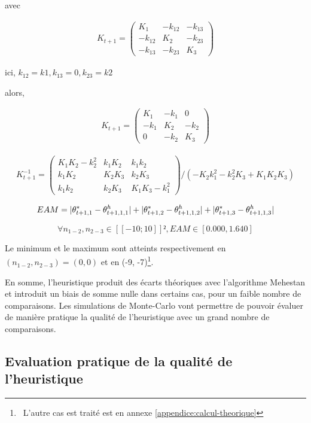 avec 

\begin{align*}
K_{t+1}= \begin{pmatrix}
K_1&-k_{12}&-k_{13}\\
-k_{12}&K_2&-k_{23}\\
-k_{13}&-k_{23}&K_3
\end{pmatrix}
\end{align*}

ici, $k_{12}=k1, k_{13}=0, k_{23}=k2$

alors, 

\begin{align*}
K_{t+1}= \begin{pmatrix}
K_1&-k_1&0\\
-k_1&K_2&-k_2\\
0&-k_2&K_3
\end{pmatrix}    
\end{align*}

\begin{align*}
K^{-1}_{t+1}= \left( \begin{array}{ccc} K_1 K_2-k_2^2 & k_1 K_2 & k_1 k_2 \\ k_1 K_2 & K_2 K_3 & k_2 K_3 \\ k_1 k_2 & k_2 K_3 & K_1 K_3-k_1^2 \end{array} \right)/(-K_2 k_1^2-k_2^2 K_3+K_1 K_2 K_3)    
\end{align*}

\begin{equation*}
EAM=  |\theta^*_{t+1,1} - \theta^h_{t+1,1,1}|   +  |\theta^*_{t+1,2} - \theta^h_{t+1,1,2}|  +  |\theta^*_{t+1,3} - \theta^h_{t+1,1,3}|
\end{equation*}

\begin{equation*}
\forall{n_{1-2},n_{2-3}}\in [\![-10;10]\!]² ,  EAM \in [ 0.000,1.640 ]
\end{equation*}


Le minimum et le maximum sont atteints respectivement en $(n_{1-2},n_{2-3})=(0, 0)$ et en (-9, -7)\footnote{~L'autre cas est traité est en annexe \ref{appendice:calcul-theorique}}.

En somme, l'heuristique produit des écarts théoriques avec l'algorithme Mehestan et introduit un biais de somme nulle dans certains cas, pour un faible nombre de comparaisons. Les simulations de Monte-Carlo vont permettre de pouvoir évaluer de manière pratique la qualité de l'heuristique avec un grand nombre de comparaisons.

\subsection{Evaluation pratique de la qualité de l'heuristique}
